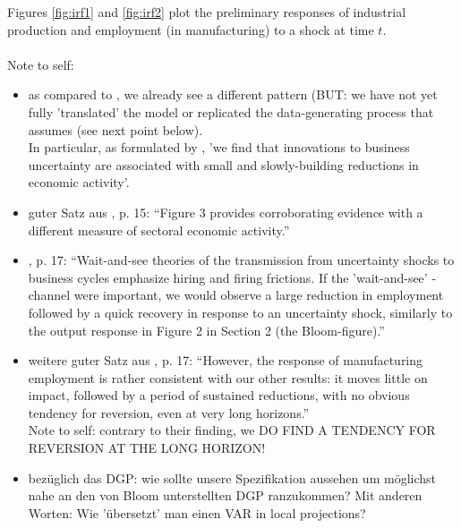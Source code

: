 \documentclass[a4paper,12pt,oneside,pointednumbers,bibtotoc,bigheadings,liststotoc]{scrbook}
\begin{document}
Figures \ref{fig:irf1} and \ref{fig:irf2} plot the preliminary responses of industrial production and employment (in manufacturing) to a shock at time $t$. \\
\\
\begingroup
    \fontsize{8pt}{12pt}\selectfont
    Note to self:
\begin{itemize}
	\item as compared to \citet{bloom:09}, we already see a different pattern (BUT: we have not yet fully 'translated' the model or replicated the data-generating process that \citet{bloom:09} assumes (see next point below).\\
	In particular, as formulated by \citet{bachmannetal:13}, 'we find that innovations to business uncertainty are associated with small and slowly-building reductions in economic activity'. 
	\item guter Satz aus \citet{bachmannetal:13}, p. 15: ``Figure 3 provides corroborating evidence with a different measure of sectoral economic activity.'' 
	\item \citet{bachmannetal:13}, p. 17: ``Wait-and-see theories of the transmission from uncertainty shocks to business cycles emphasize hiring and firing frictions. If the 'wait-and-see' - channel were important, we would observe a large reduction in employment followed by a quick recovery in response to an uncertainty shock, similarly to the output response in Figure 2 in Section 2 (the Bloom-figure).''
	\item weitere guter Satz aus \citet{bachmannetal:13}, p. 17: ``However, the response of manufacturing employment is rather consistent with our other results: it moves little on impact, followed by a period of sustained reductions, with no obvious tendency for reversion, even at very long horizons.'' \\
	Note to self: contrary to their finding, we DO FIND A TENDENCY FOR REVERSION AT THE LONG HORIZON!
	\item bezüglich das DGP: wie sollte unsere Spezifikation aussehen um möglichst nahe an den von Bloom unterstellten DGP ranzukommen? Mit anderen Worten: Wie 'übersetzt' man einen VAR in local projections?
\end{itemize}
\endgroup
\end{document}
